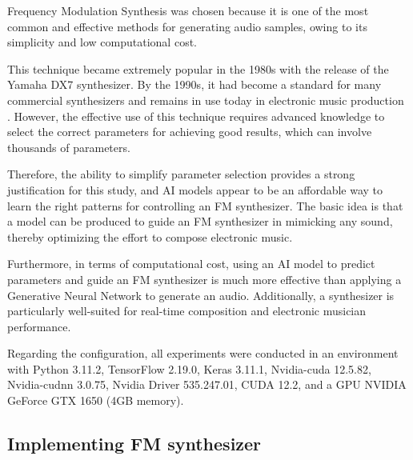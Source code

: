 \documentclass[10pt,conference]{IEEEtran}
\begin{document}
Frequency Modulation Synthesis was chosen because it is one of the most common and effective methods for generating audio samples, owing to its simplicity and low computational cost.

This technique became extremely popular in the 1980s with the release of the Yamaha DX7 synthesizer. By the 1990s, it had become a standard for many commercial synthesizers and remains in use today in electronic music production \cite{claesson2021resynthesis}. However, the effective use of this technique requires advanced knowledge to select the correct parameters for achieving good results, which can involve thousands of parameters.

Therefore, the ability to simplify parameter selection provides a strong justification for this study, and AI models appear to be an affordable way to learn the right patterns for controlling an FM synthesizer. The basic idea is that a model can be produced to guide an FM synthesizer in mimicking any sound, thereby optimizing the effort to compose electronic music.

Furthermore, in terms of computational cost, using an AI model to predict parameters and guide an FM synthesizer is much more effective than applying a Generative Neural Network to generate an audio. Additionally, a synthesizer is particularly well-suited for real-time composition and electronic musician performance.

Regarding the configuration, all experiments were conducted in an environment with Python 3.11.2, TensorFlow 2.19.0, Keras 3.11.1, Nvidia-cuda 12.5.82, Nvidia-cudnn 3.0.75, Nvidia Driver 535.247.01, CUDA 12.2, and a GPU NVIDIA GeForce GTX 1650 (4GB memory).


\subsection{Implementing FM synthesizer}
\end{document}
